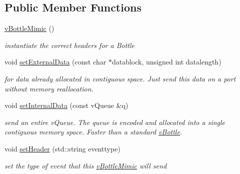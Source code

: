\subsection*{Public Member Functions}
\begin{DoxyCompactItemize}
\item 
\mbox{\label{classev_1_1vBottleMimic_ae7a95df35d75378e949ceff50d169ddf}} 
\hyperlink{classev_1_1vBottleMimic_ae7a95df35d75378e949ceff50d169ddf}{v\+Bottle\+Mimic} ()
\begin{DoxyCompactList}\small\item\em instantiate the correct headers for a Bottle \end{DoxyCompactList}\item 
\mbox{\label{classev_1_1vBottleMimic_ac3e34609dfb06ed5c10509741751c053}} 
void \hyperlink{classev_1_1vBottleMimic_ac3e34609dfb06ed5c10509741751c053}{set\+External\+Data} (const char $\ast$datablock, unsigned int datalength)
\begin{DoxyCompactList}\small\item\em for data already allocated in contiguous space. Just send this data on a port without memory reallocation. \end{DoxyCompactList}\item 
\mbox{\label{classev_1_1vBottleMimic_ae32460f8fb474c394171f783d9e4aba1}} 
void \hyperlink{classev_1_1vBottleMimic_ae32460f8fb474c394171f783d9e4aba1}{set\+Internal\+Data} (const v\+Queue \&q)
\begin{DoxyCompactList}\small\item\em send an entire v\+Queue. The queue is encoded and allocated into a single contiguous memory space. Faster than a standard \hyperlink{classev_1_1vBottle}{v\+Bottle}. \end{DoxyCompactList}\item 
\mbox{\label{classev_1_1vBottleMimic_ac0f5995820702df0aea2ede33d65cace}} 
void \hyperlink{classev_1_1vBottleMimic_ac0f5995820702df0aea2ede33d65cace}{set\+Header} (std\+::string eventtype)
\begin{DoxyCompactList}\small\item\em set the type of event that this \hyperlink{classev_1_1vBottleMimic}{v\+Bottle\+Mimic} will send \end{DoxyCompactList}\item 

\end{DoxyCompactItemize}
